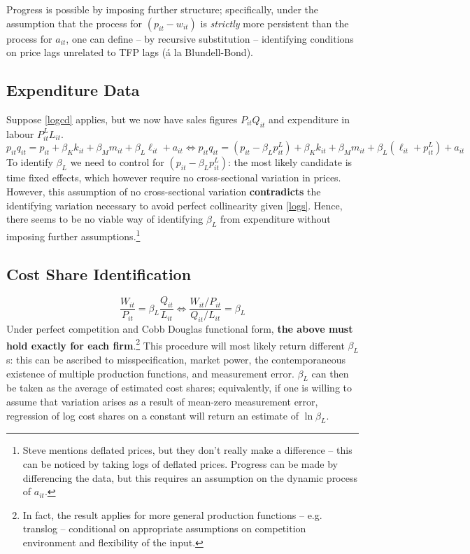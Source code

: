 \documentclass[11pt]{article}
\begin{document}
Progress is possible by imposing further structure; specifically, under the assumption that the process for $(p_{it} - w_{it})$ is \textit{strictly} more persistent than the process for $a_{it}$, one can define -- by recursive substitution -- identifying conditions on price lags unrelated to TFP lags (\'{a} la Blundell-Bond).

\subsection{Expenditure Data}
Suppose \eqref{logcd} applies, but we now have sales figures $P_{it}Q_{it}$ and expenditure in labour $P^L_{it}L_{it}$.
\begin{equation}
	p_{it}q_{it} = p_{it} + \beta_K k_{it} + \beta_M m_{it} + \beta_L \ell_{it} + a_{it} \Leftrightarrow
	p_{it}q_{it} = (p_{it} - \beta_Lp^L_{it}) + \beta_K k_{it} + \beta_M m_{it} + \beta_L (\ell_{it} + p^L_{it}) + a_{it}
\end{equation}
To identify $\beta_L$ we need to control for $(p_{it} - \beta_Lp^L_{it})$: the most likely candidate is time fixed effects, which however require no cross-sectional variation in prices.
However, this assumption of no cross-sectional variation \textbf{contradicts} the identifying variation necessary to avoid perfect collinearity given \eqref{logs}.
Hence, there seems to be no viable way of identifying $\beta_L$ from expenditure without imposing further assumptions.\footnote{Steve mentions deflated prices, but they don't really make a difference -- this can be noticed by taking logs of deflated prices. Progress can be made by differencing the data, but this requires an assumption on the dynamic process of $a_{it}$.}

\subsection{Cost Share Identification}
\begin{equation}
	\frac{W_{it}}{P_{it}} = \beta_L \frac{Q_{it}}{L_{it}} \Leftrightarrow \frac{W_{it}/P_{it}}{Q_{it}/L_{it}} = \beta_L
\end{equation}
Under perfect competition and Cobb Douglas functional form, \textbf{the above must hold exactly for each firm}.\footnote{In fact, the result applies for more general production functions -- e.g. translog -- conditional on appropriate assumptions on competition environment and flexibility of the input.}
This procedure will most likely return different $\beta_L$s: this can be ascribed to misspecification, market power, the contemporaneous existence of multiple production functions, and measurement error.
$\beta_L$ can then be taken as the average of estimated cost shares; equivalently, if one is willing to assume that variation arises as a result of mean-zero measurement error, regression of log cost shares on a constant will return an estimate of $\ln \beta_L$.
\end{document}
